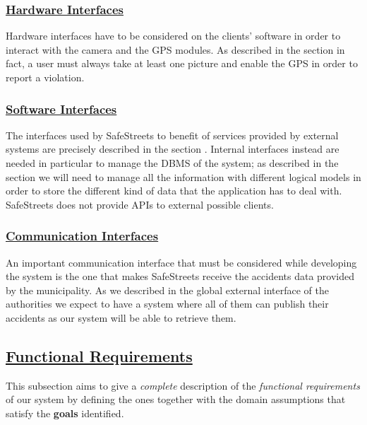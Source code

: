 	\FloatBarrier
	
	\subsubsection[Hardware Interfaces]{\hyperlink{toc}{Hardware Interfaces}}
		Hardware interfaces have to be considered on the clients' software in order to interact with the camera and the GPS modules. As described in the section  in fact, a user must always take at least one picture and enable the GPS in order to report a violation. 
		
	\subsubsection[Software Interfaces]{\hyperlink{toc}{Software Interfaces}}
		The interfaces used by SafeStreets to benefit of services provided by external systems are precisely described in the section . Internal interfaces instead are needed in particular to manage the DBMS of the system; as described in the section  we will need to manage all the information with different logical models in order to store the different kind of data that the application has to deal with. SafeStreets does not provide APIs to external possible clients.
		
	\subsubsection[Communication Interfaces]{\hyperlink{toc}{Communication Interfaces}}
		An important communication interface that must be considered while developing the system is the one that makes SafeStreets receive the accidents data provided by the municipality. As we described in the global external interface of the authorities we expect to have a system where all of them can publish their accidents as our system will be able to retrieve them.

\subsection[Functional Requirements]{\hyperlink{toc}{Functional Requirements}}
	\label{sec:functionalRequirements}
	This subsection aims to give a \emph{complete} description of the \emph{functional requirements} of our system by defining the ones together with the domain assumptions that satisfy the \textbf{goals} identified.
	

